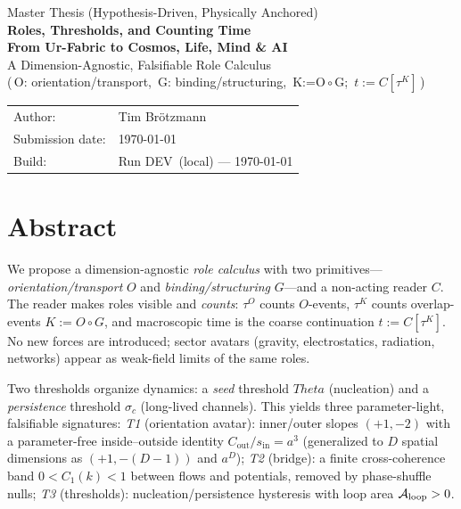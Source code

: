 \documentclass[12pt,a4paper,oneside]{scrreprt}
\def\Theta{Theta}%
\def\BuildRun{DEV}\def\BuildSHA{local}\def\BuildDate{\today}%
\begin{document}
\begin{titlepage}
  \centering
  {\Large Master Thesis (Hypothesis-Driven, Physically Anchored)}\\[0.6em]
  {\huge\bfseries Roles, Thresholds, and Counting Time}\\[0.25em]
  {\Large\bfseries From Ur-Fabric to Cosmos, Life, Mind \& AI}\\[1.0em]
  {\large A Dimension-Agnostic, Falsifiable Role Calculus}\\[-0.2em]
  {\small (\,O: orientation/transport,\ G: binding/structuring,\ K:=O$\!\circ$G;\ $t:=C[\tau^K]$\,)}\\[2.0em]

  \begin{tabular}{@{}ll@{}}
    Author: & Tim Brötzmann \\
    Submission date: & \today \\
    Build: & Run \BuildRun\ (\BuildSHA) — \BuildDate \\
  \end{tabular}

  \vfill
\end{titlepage}


\chapter*{Abstract}
We propose a dimension-agnostic \emph{role calculus} with two primitives—%
\emph{orientation/transport} $O$ and \emph{binding/structuring} $G$—and a non-acting reader $C$.
The reader makes roles visible and \emph{counts}: $\tau^O$ counts $O$-events, $\tau^K$ counts overlap-events $K:=O\!\circ G$, and macroscopic time is the coarse continuation $t:=C[\tau^K]$.
No new forces are introduced; sector avatars (gravity, electrostatics, radiation, networks) appear as weak-field limits of the same roles.

Two thresholds organize dynamics: a \emph{seed} threshold $\Theta$ (nucleation) and a \emph{persistence} threshold $\sigma_c$ (long-lived channels). This yields three parameter-light, falsifiable signatures:
\emph{T1} (orientation avatar): inner/outer slopes $(+1,-2)$ with a parameter-free inside–outside identity $C_{\mathrm{out}}/s_{\mathrm{in}}=a^3$ (generalized to $D$ spatial dimensions as $(+1,-(D\!-\!1))$ and $a^{D}$);
\emph{T2} (bridge): a finite cross-coherence band $0<C_1(k)<1$ between flows and potentials, removed by phase-shuffle nulls;
\emph{T3} (thresholds): nucleation/persistence hysteresis with loop area $\mathcal A_{\rm loop}>0$.
\end{document}
